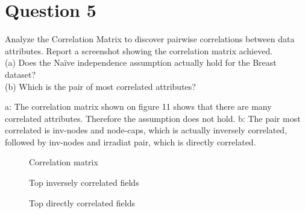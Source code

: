 \section{Question 5}

\begin{question}
    Analyze the Correlation Matrix to discover pairwise correlations between data attributes. Report a
screenshot showing the correlation matrix achieved.
    \\
    (a) Does the Naïve independence assumption actually hold for the Breast dataset?
    \\
    (b) Which is the pair of most correlated attributes?
\end{question}

\begin{answer}
    a: The correlation matrix shown on figure 11 shows that there are many correlated
    attributes. Therefore the assumption does not hold.
    b: The pair most correlated is inv-nodes and node-caps, which is actually inversely
    correlated, followed by inv-nodes and irradiat pair, which is directly correlated.
    \begin{figure}
        \centering
        \caption{Correlation matrix}
    \end{figure}
    \begin{figure}
        \centering
        \caption{Top inversely correlated fields}
    \end{figure}
    \begin{figure}
        \centering
        \caption{Top directly correlated fields}
    \end{figure}
\end{answer}
